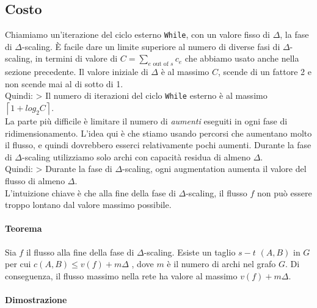 \subsection{Costo}

Chiamiamo un'iterazione del ciclo esterno \texttt{While}, con un valore
fisso di $\Delta$, la fase di $\Delta$-scaling. È facile dare un
limite superiore al numero di diverse fasi di $\Delta$-scaling, in
termini di valore di $C = \sum_{e \text{ out of }s} c_e$ che abbiamo
usato anche nella sezione precedente. Il valore iniziale di $\Delta$ è
al massimo $C$, scende di un fattore 2 e non scende mai al di sotto di
1.\\

Quindi: \textgreater{} Il numero di iterazioni del ciclo \texttt{While}
esterno è al massimo $\left\lceil 1 + log_2 C \right\rceil$.\\

La parte più difficile è limitare il numero di \emph{aumenti} eseguiti
in ogni fase di ridimensionamento. L'idea qui è che stiamo usando
percorsi che aumentano molto il flusso, e quindi dovrebbero esserci
relativamente pochi aumenti. Durante la fase di $\Delta$-scaling
utilizziamo solo archi con capacità residua di almeno $\Delta$.\\
Quindi: \textgreater{} Durante la fase di $\Delta$-scaling, ogni
augmentation aumenta il valore del flusso di almeno $\Delta$.\\

L'intuizione chiave è che alla fine della fase di $\Delta$-scaling, il
flusso $f$ non può essere troppo lontano dal valore massimo possibile.\\

\paragraph{Teorema}

\begin{myblockquote}
Sia $f$ il flusso alla fine della fase di $\Delta$-scaling. Esiste
un taglio $s-t$ $(A, B)$ in $G$ per cui
$c(A, B) \le v(f) + m\Delta$ , dove $m$ è il numero di archi nel
grafo $G$. Di conseguenza, il flusso massimo nella rete ha valore al
massimo $v(f) + m\Delta$.
\end{myblockquote}

\paragraph{Dimostrazione}

